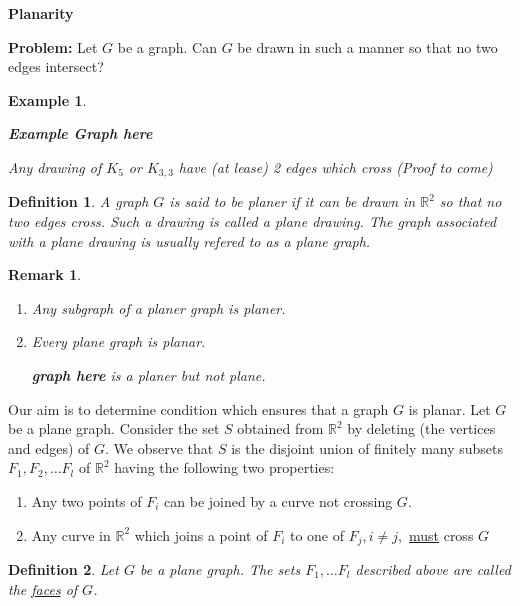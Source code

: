 \documentclass[12pt]{article}
\newtheorem{example}{Example}
\newtheorem{definition}{Definition}
\newtheorem*{remark}{Remark}
\begin{document}
\textbf{Planarity}

\textbf{Problem:} Let $G$ be a graph. Can $G$ be drawn in such a manner so that no two edges intersect?


\begin{example}


	\begin{enumerate}
		\textbf{Example Graph here}
	\end{enumerate}

	Any drawing of $K_{5}$ or $K_{3,3}$ have (at lease) 2 edges which cross (Proof to come)
\end{example}


\begin{definition}
	A graph $G$ is said to be planer if it can be drawn in $\mathbb{R}^{2}$ so that no two edges cross. Such a drawing is called a plane drawing. The graph associated with a plane drawing is usually refered to as a plane graph.
\end{definition}

\begin{remark}

	\begin{enumerate}
		\item Any subgraph of a planer graph is planer.
		\item Every plane graph is planar.

		      \textbf{graph here}
		      is a planer but not plane.
	\end{enumerate}

\end{remark}


Our aim is to determine condition which ensures that a graph $G$ is planar. Let $G$ be a plane graph. Consider the set $S$ obtained from $\mathbb{R}^{2}$ by deleting (the vertices and edges) of $G$.
We observe that $S$ is the disjoint union of finitely many subsets $F_{1}, F_{2},\dots F_{l}$ of $\mathbb{R}^{2}$ having the following two properties:

\begin{enumerate}
	\item Any two points of $F_{i}$ can be joined by a curve not crossing $G$.
	\item Any curve in $\mathbb{R}^{2}$ which joins a point of $F_{i}$ to one of $F_{j}, i\neq j, $ \underline{must} cross $G$
\end{enumerate}


\begin{definition}
	Let $G$ be a plane graph. The sets $F_{1}, \dots F_{l}$ described above are called the \underline{faces} of $G$.
\end{definition}
\end{document}
